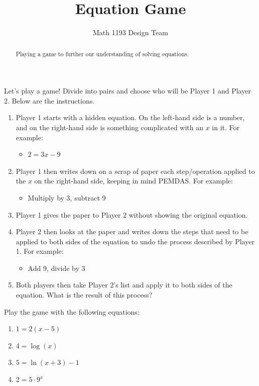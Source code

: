 \documentclass[noauthor]{ximera}
\title{Equation Game}
\author{Math 1193 Design Team}
\begin{document}
\begin{abstract}
    Playing a game to further our understanding of solving equations.
\end{abstract}
\maketitle

Let's play a game! Divide into pairs and choose who will be
Player 1 and Player 2. Below are the instructions.

\begin{enumerate}
    \item Player 1 starts with a hidden equation. On the left-hand side
    is a number, and on the right-hand side is something complicated
    with an \(x\) in it. For example:
    \begin{itemize}
        \item \(2 = 3x - 9\)
    \end{itemize}
    \item Player 1 then writes down on a scrap of paper each step/operation
    applied to the \(x\) on the right-hand side, keeping in mind PEMDAS.
    For example:
    \begin{itemize}
        \item Multiply by 3, subtract 9
    \end{itemize}
    \item Player 1 gives the paper to Player 2 without showing the original
    equation.
    \item Player 2 then looks at the paper and writes down the steps
    that need to be applied to both sides of the equation to undo
    the process described by Player 1. For example:
    \begin{itemize}
        \item Add 9, divide by 3
    \end{itemize}
    \item Both players then take Player 2's list and apply it to both sides
    of the equation. What is the result of this process?
\end{enumerate}

Play the game with the following equations:
\begin{enumerate}
    \item \(1 = 2(x - 5)\)
    \item \(4 = \log(x)\)
    \item \(5 = \ln(x + 3) - 1\)
    \item \(2 = 5 \cdot 9^x\) 
\end{enumerate}
\end{document}
